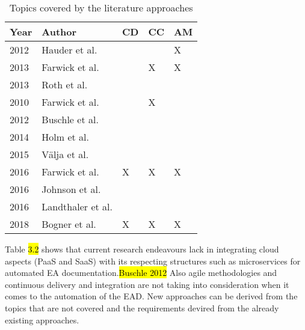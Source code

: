 \begin{table}[htpb]
  \caption[Topics covered by the literature approaches]{Topics covered by the literature approaches}\label{tab:sample}
  \centering
  \begin{tabular}{l l l l l}
    \toprule
      Year & Author & CD & CC & AM\\
    \midrule
      2012 & Hauder et al. &   &   & X\\
      2013 & Farwick et al. &   & X & X\\
      2013 & Roth et al. &   &   &  \\
      2010 & Farwick et al. &   & X &  \\
      2012 & Buschle et al. &   &   &  \\
      2014 & Holm et al. &   &   &  \\
      2015 & Välja et al. &   &   &  \\
      2016 & Farwick et al. & X & X & X\\
      2016 & Johnson et al. &   &   &  \\
      2016 & Landthaler et al. &   &   &  \\
      2018 & Bogner et al. & X & X & X\\
    \bottomrule
  \end{tabular}
\end{table}

Table \hl{3.2} shows that current research endeavours lack in integrating cloud aspects (PaaS and SaaS) with its respecting structures such as microservices for automated EA documentation.\hl{Buschle 2012} Also agile methodologies and continuous delivery and integration are not taking into consideration when it comes to the automation of the EAD. New approaches can be derived from the topics that are not covered and the requirements devired from the already existing approaches.


